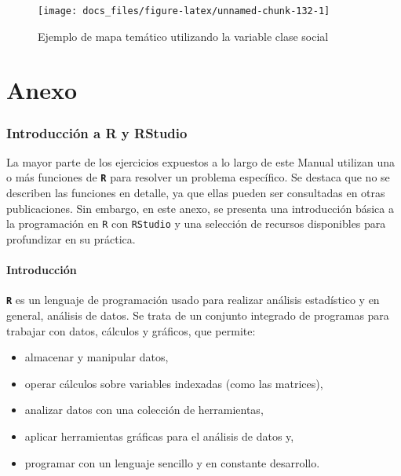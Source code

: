 \documentclass[
]{article}
\begin{document}
\begin{figure}

{\centering \texttt{[image: docs\_files/figure-latex/unnamed-chunk-132-1]} 

}

\caption{Ejemplo de mapa temático utilizando la variable clase social}\label{fig:unnamed-chunk-132}
\end{figure}

\hypertarget{part-anexo}{%
\part{Anexo}\label{part-anexo}}

\hypertarget{anexo}{%
\section{Introducción a R y RStudio}\label{anexo}}

La mayor parte de los ejercicios expuestos a lo largo de este Manual utilizan una o más funciones de \textbf{\texttt{R}} para resolver un problema específico. Se destaca que no se describen las funciones en detalle, ya que ellas pueden ser consultadas en otras publicaciones. Sin embargo, en este anexo, se presenta una introducción básica a la programación en \texttt{R} con \texttt{RStudio} y una selección de recursos disponibles para profundizar en su práctica.

\hypertarget{introR}{%
\subsection{Introducción}\label{introR}}

\textbf{\texttt{R}} es un lenguaje de programación usado para realizar análisis estadístico y en general, análisis de datos. Se trata de un conjunto integrado de programas para trabajar con datos, cálculos y gráficos, que permite:

\begin{itemize}
\item
  almacenar y manipular datos,
\item
  operar cálculos sobre variables indexadas (como las matrices),
\item
  analizar datos con una colección de herramientas,
\item
  aplicar herramientas gráficas para el análisis de datos y,
\item
  programar con un lenguaje sencillo y en constante desarrollo.
\end{itemize}
\end{document}
